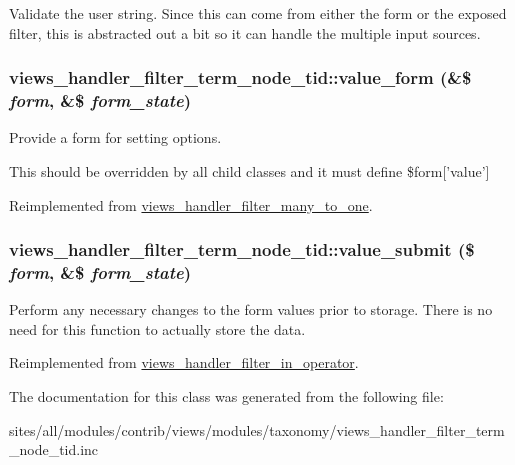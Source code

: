 Validate the user string. Since this can come from either the form or the exposed filter, this is abstracted out a bit so it can handle the multiple input sources. \hypertarget{classviews__handler__filter__term__node__tid_3259d8a91cb0c13c51c02942b267b131}{
\subsubsection[{value\_\-form}]{\setlength{\rightskip}{0pt plus 5cm}views\_\-handler\_\-filter\_\-term\_\-node\_\-tid::value\_\-form (\&\$ {\em form}, \/  \&\$ {\em form\_\-state})}}
\label{classviews__handler__filter__term__node__tid_3259d8a91cb0c13c51c02942b267b131}


Provide a form for setting options.

This should be overridden by all child classes and it must define \$form\mbox{[}'value'\mbox{]} 

Reimplemented from \hyperlink{classviews__handler__filter__many__to__one_6c5e3bbabc2ed73418f835195c10f451}{views\_\-handler\_\-filter\_\-many\_\-to\_\-one}.\hypertarget{classviews__handler__filter__term__node__tid_48244c2456ac78e1855d9a48632ce045}{
\subsubsection[{value\_\-submit}]{\setlength{\rightskip}{0pt plus 5cm}views\_\-handler\_\-filter\_\-term\_\-node\_\-tid::value\_\-submit (\$ {\em form}, \/  \&\$ {\em form\_\-state})}}
\label{classviews__handler__filter__term__node__tid_48244c2456ac78e1855d9a48632ce045}


Perform any necessary changes to the form values prior to storage. There is no need for this function to actually store the data. 

Reimplemented from \hyperlink{classviews__handler__filter__in__operator_f7b01b1f4e53aec7f4b1065606819624}{views\_\-handler\_\-filter\_\-in\_\-operator}.

The documentation for this class was generated from the following file:\begin{CompactItemize}
\item 
sites/all/modules/contrib/views/modules/taxonomy/views\_\-handler\_\-filter\_\-term\_\-node\_\-tid.inc\end{CompactItemize}
